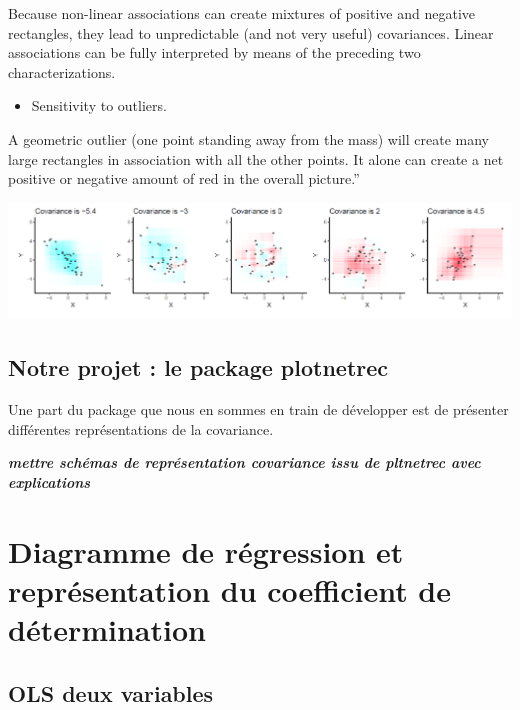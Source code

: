 \documentclass[
]{report}
\providecommand{\tightlist}{%
  \setlength{\itemsep}{0pt}\setlength{\parskip}{0pt}}
\begin{document}
Because non-linear associations can create mixtures of positive and negative rectangles, they lead to unpredictable (and not very useful) covariances. Linear associations can be fully interpreted by means of the preceding two characterizations.

\begin{itemize}
\tightlist
\item
  Sensitivity to outliers.
\end{itemize}

A geometric outlier (one point standing away from the mass) will create many large rectangles in association with all the other points. It alone can create a net positive or negative amount of red in the overall picture.''

\includegraphics{covRect.PNG}

\hypertarget{notre-projet-le-package-plotnetrec}{%
\section{Notre projet : le package plotnetrec}\label{notre-projet-le-package-plotnetrec}}

Une part du package que nous en sommes en train de développer est de présenter différentes représentations de la covariance.

\textbf{\emph{mettre schémas de représentation covariance issu de pltnetrec avec explications}}

\hypertarget{diagramme-de-ruxe9gression-et-repruxe9sentation-du-coefficient-de-duxe9termination}{%
\chapter{Diagramme de régression et représentation du coefficient de détermination}\label{diagramme-de-ruxe9gression-et-repruxe9sentation-du-coefficient-de-duxe9termination}}

\hypertarget{ols-deux-variables}{%
\section{OLS deux variables}\label{ols-deux-variables}}
\end{document}
